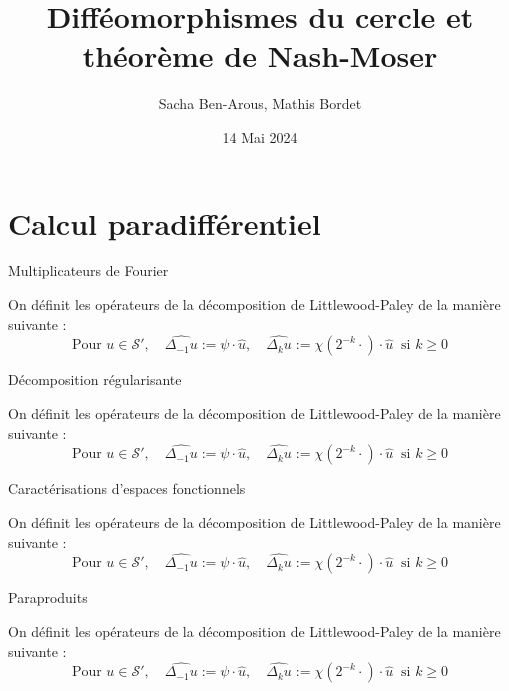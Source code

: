 \documentclass[10pt]{beamer}
\title{Difféomorphismes du cercle et théorème de Nash-Moser}
\date{14 Mai 2024}
\author{Sacha Ben-Arous, Mathis Bordet}
\institute{ENS Paris-Saclay}
\begin{document}
  \maketitle
\begin{frame}
\tableofcontents
\end{frame}  

\section{Calcul paradifférentiel}

\begin{frame}{Multiplicateurs de Fourier}

On définit les opérateurs de la décomposition de Littlewood-Paley de la manière suivante :
\[
\text{Pour } u \in \mathcal{S}', \quad \widehat{\Delta_{-1} u} := \psi \cdot \hat{u}, \quad \widehat{\Delta_{k} u} := \chi(2^{-k} \cdot) \cdot \hat{u} \ \text{ si } k \geq 0
\]

\end{frame}

\begin{frame}{Décomposition régularisante}

On définit les opérateurs de la décomposition de Littlewood-Paley de la manière suivante :
\[
\text{Pour } u \in \mathcal{S}', \quad \widehat{\Delta_{-1} u} := \psi \cdot \hat{u}, \quad \widehat{\Delta_{k} u} := \chi(2^{-k} \cdot) \cdot \hat{u} \ \text{ si } k \geq 0
\]

\end{frame}


\begin{frame}{Caractérisations d'espaces fonctionnels}

On définit les opérateurs de la décomposition de Littlewood-Paley de la manière suivante :
\[
\text{Pour } u \in \mathcal{S}', \quad \widehat{\Delta_{-1} u} := \psi \cdot \hat{u}, \quad \widehat{\Delta_{k} u} := \chi(2^{-k} \cdot) \cdot \hat{u} \ \text{ si } k \geq 0
\]

\end{frame}

\begin{frame}{Paraproduits}

On définit les opérateurs de la décomposition de Littlewood-Paley de la manière suivante :
\[
\text{Pour } u \in \mathcal{S}', \quad \widehat{\Delta_{-1} u} := \psi \cdot \hat{u}, \quad \widehat{\Delta_{k} u} := \chi(2^{-k} \cdot) \cdot \hat{u} \ \text{ si } k \geq 0
\]

\end{frame}
\end{document}
